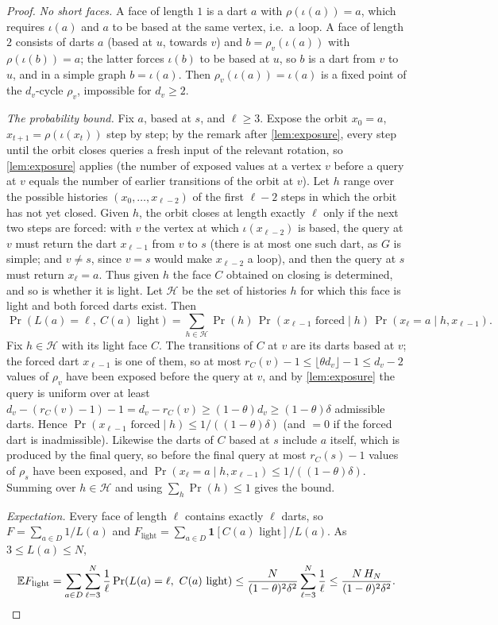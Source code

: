 \documentclass[11pt,a4paper]{article}
\theoremstyle{plain}
\theoremstyle{definition}
\theoremstyle{remark}
\newcommand{\E}{\mathbb E}
\newcommand{\ind}{\mathbf 1}
\newcommand{\Flight}{F_{\mathrm{light}}}
\begin{document}
\label{pf:light}
\lemlight*
\begin{proof}
\emph{No short faces.} A face of length $1$ is a dart $a$ with $\rho(\iota(a))=a$, which requires $\iota(a)$ and $a$ to be based at the same vertex, i.e.\ a loop. A face of length $2$ consists of darts $a$ (based at $u$, towards $v$) and $b=\rho_v(\iota(a))$ with $\rho(\iota(b))=a$; the latter forces $\iota(b)$ to be based at $u$, so $b$ is a dart from $v$ to $u$, and in a simple graph $b=\iota(a)$. Then $\rho_v(\iota(a))=\iota(a)$ is a fixed point of the $d_v$-cycle $\rho_v$, impossible for $d_v\ge2$.

\emph{The probability bound.} Fix $a$, based at $s$, and $\ell\ge3$. Expose the orbit $x_0=a$, $x_{t+1}=\rho(\iota(x_t))$ step by step; by the remark after \cref{lem:exposure}, every step until the orbit closes queries a fresh input of the relevant rotation, so \cref{lem:exposure} applies (the number of exposed values at a vertex $v$ before a query at $v$ equals the number of earlier transitions of the orbit at $v$). Let $h$ range over the possible histories $(x_0,\dots,x_{\ell-2})$ of the first $\ell-2$ steps in which the orbit has not yet closed. Given $h$, the orbit closes at length exactly $\ell$ only if the next two steps are forced: with $v$ the vertex at which $\iota(x_{\ell-2})$ is based, the query at $v$ must return the dart $x_{\ell-1}$ from $v$ to $s$ (there is at most one such dart, as $G$ is simple; and $v\ne s$, since $v=s$ would make $x_{\ell-2}$ a loop), and then the query at $s$ must return $x_\ell=a$. Thus given $h$ the face $C$ obtained on closing is determined, and so is whether it is light. Let $\mathcal H$ be the set of histories $h$ for which this face is light and both forced darts exist. Then
\[
 \Pr(L(a)=\ell,\ C(a)\text{ light})=\sum_{h\in\mathcal H}\Pr(h)\,\Pr(x_{\ell-1}\text{ forced}\mid h)\,\Pr(x_\ell=a\mid h,x_{\ell-1}).
\]
Fix $h\in\mathcal H$ with its light face $C$. The transitions of $C$ at $v$ are its darts based at $v$; the forced dart $x_{\ell-1}$ is one of them, so at most $r_C(v)-1\le\lfloor\theta d_v\rfloor-1\le d_v-2$ values of $\rho_v$ have been exposed before the query at $v$, and by \cref{lem:exposure} the query is uniform over at least $d_v-(r_C(v)-1)-1=d_v-r_C(v)\ge(1-\theta)d_v\ge(1-\theta)\delta$ admissible darts. Hence $\Pr(x_{\ell-1}\text{ forced}\mid h)\le1/((1-\theta)\delta)$ (and $=0$ if the forced dart is inadmissible). Likewise the darts of $C$ based at $s$ include $a$ itself, which is produced by the final query, so before the final query at most $r_C(s)-1$ values of $\rho_s$ have been exposed, and $\Pr(x_\ell=a\mid h,x_{\ell-1})\le1/((1-\theta)\delta)$. Summing over $h\in\mathcal H$ and using $\sum_h\Pr(h)\le1$ gives the bound.

\emph{Expectation.} Every face of length $\ell$ contains exactly $\ell$ darts, so $F=\sum_{a\in D}1/L(a)$ and $\Flight=\sum_{a\in D}\ind[C(a)\text{ light}]/L(a)$. As $3\le L(a)\le N$,
\[
 \E\Flight=\sum_{a\in D}\sum_{\ell=3}^{N}\frac1\ell\Pr(L(a)=\ell,\ C(a)\text{ light})\le\frac{N}{(1-\theta)^2\delta^2}\sum_{\ell=3}^N\frac1\ell\le\frac{N\,H_N}{(1-\theta)^2\delta^2}.\qedhere
\]
\end{proof}
\end{document}
